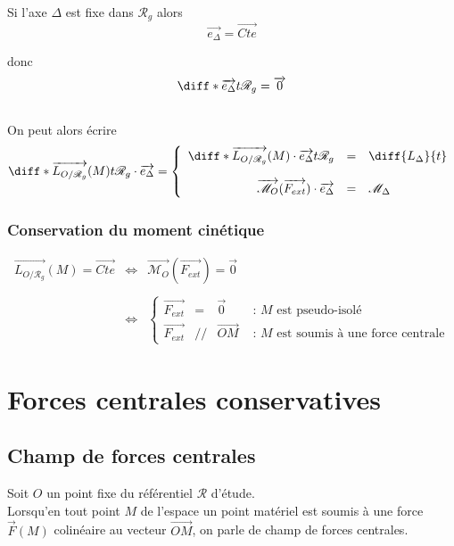 \documentclass[a4paper,10pt]{book} %
\begin{document}
Si l'axe $\Delta$ est fixe dans $\mathcal{R}_g$ alors $$\overrightarrow{e_\Delta}=\overrightarrow{Cte}$$

donc $$\diff*{\overrightarrow{e_\Delta}}{t}{\mathcal{R}_g}=\overrightarrow{0}$$\\

On peut alors écrire $$\diff*{\overrightarrow{L_{O/\mathcal{R}_g}}(M)}{t}{\mathcal{R}_g}\cdot \overrightarrow{e_\Delta}=\left\{\begin{array}{rcl} \diff*{\overrightarrow{L_{O/\mathcal{R}_g}}(M)\cdot\overrightarrow{e_\Delta}}{t}{\mathcal{R}_g}&=& \diff{L_\Delta}{t}\\\\
\overrightarrow{\mathcal{M}_O}(\overrightarrow{F_{ext}})\cdot \overrightarrow{e_\Delta}&=&\mathcal{M}_\Delta
\end{array}\right.$$

\bigskip

\subsubsection{Conservation du moment cinétique}
$$\begin{array}{rcl}
\overrightarrow{L_{O/\mathcal{R}_g}}(M)=\overrightarrow{Cte}&\Leftrightarrow&\overrightarrow{\mathcal{M}_O}(\overrightarrow{F_{ext}}) =\overrightarrow{0}\\\\
&\Leftrightarrow&
\left\{ \begin{array}{rccl} \overrightarrow{F_{ext}}&=&\overrightarrow{0}&\text{ : }M\text{ est pseudo-isolé} \\
\overrightarrow{F_{ext}}&//&\overrightarrow{OM}&\text{ : }M\text{ est soumis à une force centrale} \end{array}\right.\end{array}$$

\newpage

\section{Forces centrales conservatives}
\subsection{Champ de forces centrales}
Soit $O$ un point fixe du référentiel $\mathcal{R}$ d'étude.\\
Lorsqu'en tout point $M$ de l'espace un point matériel est soumis à une force $\overrightarrow{F}(M)$ colinéaire au vecteur $\overrightarrow{OM}$, on parle de champ de forces centrales.\\
\end{document}
